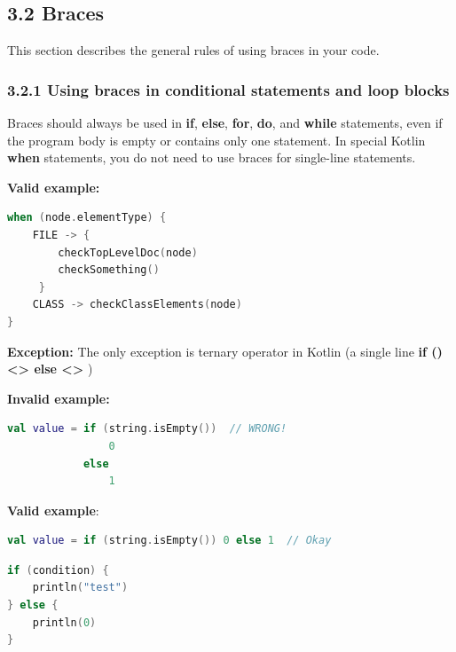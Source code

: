 {{{{{{{{{{{{{{{{\subsection*{\textbf{3.2 Braces}}

\label{sec:3.2}

This section describes the general rules of using braces in your code.

\subsubsection*{\textbf{3.2.1 Using braces in conditional statements and loop blocks}}
\leavevmode\newline

\label{sec:3.2.1}



Braces should always be used in \textbf{if}, \textbf{else}, \textbf{for}, \textbf{do}, and \textbf{while} statements, even if the program body is empty or contains only one statement. In special Kotlin \textbf{when} statements, you do not need to use braces for single-line statements. 



\textbf{Valid example:}



\begin{lstlisting}[language=Kotlin]
when (node.elementType) {
    FILE -> {
        checkTopLevelDoc(node)
        checkSomething()
     }
    CLASS -> checkClassElements(node)
}
\end{lstlisting}
\textbf{Exception:} The only exception is ternary operator in Kotlin (a single line \textbf{if () <> else <>} ) 



\textbf{Invalid example:}



\begin{lstlisting}[language=Kotlin]
val value = if (string.isEmpty())  // WRONG!
                0
            else
                1
\end{lstlisting}


\textbf{Valid example}: 



\begin{lstlisting}[language=Kotlin]
val value = if (string.isEmpty()) 0 else 1  // Okay
\end{lstlisting}


\begin{lstlisting}[language=Kotlin]
if (condition) {
    println("test")
} else {
    println(0)
}
\end{lstlisting}


}}}}}}}}}}}}}}}}

